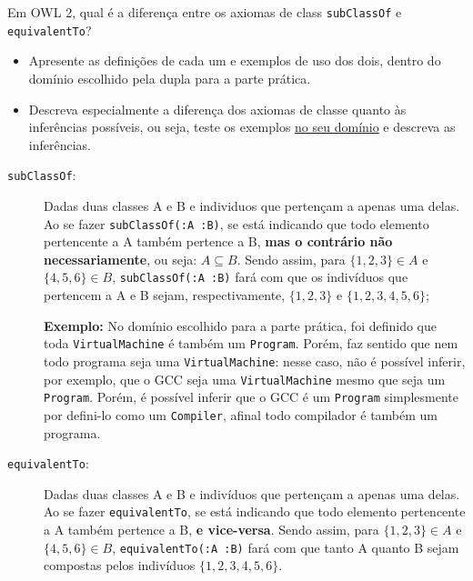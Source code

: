 \documentclass[answers]{exam}
\begin{document}
    \begin{questions}
        \question{}
        Em OWL 2, qual é a diferença entre os axiomas de class
        \texttt{subClassOf} e \texttt{equivalentTo}?
        \begin{itemize}
            \item Apresente as definições de cada um e exemplos de uso dos
                dois, dentro do domínio escolhido pela dupla para a parte
                prática.
            \item Descreva especialmente a diferença dos axiomas de classe
                quanto às inferências possíveis, ou seja, teste os exemplos
                \underline{no seu domínio} e descreva as inferências.
        \end{itemize}

        \begin{answer}
            \begin{description}
                \item [\texttt{subClassOf}:] Dadas duas classes A e B e
                    individuos que pertençam a apenas uma delas. Ao se fazer
                    \texttt{subClassOf(:A :B)}, se está indicando que todo
                    elemento pertencente a A também pertence a B, \textbf{mas o
                    contrário não necessariamente}, ou seja: $A \subseteq B$.
                    Sendo assim, para $\{1, 2, 3\} \in A$ e $\{4, 5, 6\} \in
                    B$, \texttt{subClassOf(:A :B)} fará com que os indivíduos
                    que pertencem a A e B sejam, respectivamente, $\{1, 2, 3\}$
                    e $\{1, 2, 3, 4, 5, 6\}$;

                    \textbf{Exemplo:} No domínio escolhido para a parte
                    prática, foi definido que toda \texttt{VirtualMachine} é
                    também um \texttt{Program}. Porém, faz sentido que nem todo
                    programa seja uma \texttt{VirtualMachine}: nesse caso, não
                    é possível inferir, por exemplo, que o GCC seja uma
                    \texttt{VirtualMachine} mesmo que seja um \texttt{Program}.
                    Porém, é possível inferir que o GCC é um \texttt{Program}
                    simplesmente por defini-lo como um \texttt{Compiler},
                    afinal todo compilador é também um programa.

                \item [\texttt{equivalentTo}:] Dadas duas classes A e B e
                    indivíduos que pertençam a apenas uma delas. Ao se fazer
                    \texttt{equivalentTo}, se está indicando que todo elemento
                    pertencente a A também pertence a B, \textbf{e vice-versa}.
                    Sendo assim, para $\{1, 2, 3\} \in A$ e $\{4, 5, 6\} \in
                    B$, \texttt{equivalentTo(:A :B)} fará com que tanto A
                    quanto B sejam compostas pelos indivíduos $\{1, 2, 3, 4,
                    5, 6\}$.


\end{description}
\end{answer}
\end{questions}
\end{document}
